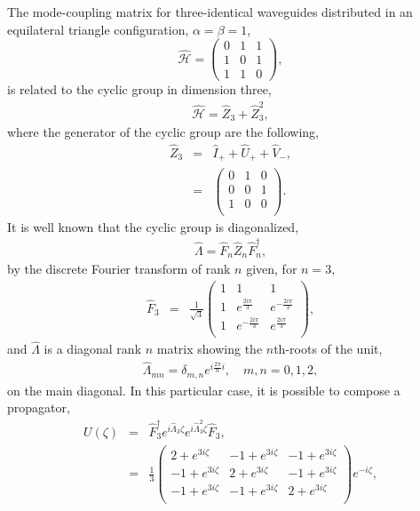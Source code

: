 \documentclass[9pt,twocolumn,twoside]{osajnl}
\begin{document}
The mode-coupling matrix for three-identical waveguides distributed in an equilateral triangle configuration, $\alpha = \beta = 1$, 
\begin{equation}
\hat{\mathcal{H}}=\left( \begin{array}{ccc}
0 & 1 & 1 \\
1 & 0 & 1 \\
1 & 1 & 0 \end{array} \right),	 
\end{equation}
is related to the cyclic group in dimension three, 
\begin{eqnarray}
\hat{\mathcal{H}} =  \hat{Z}_{3} + \hat{Z}_{3}^{2} ,
\end{eqnarray}
where the generator of the cyclic group are the following, 
\begin{eqnarray}
\hat{Z}_{3} &=& \hat{I}_{+} + \hat{U}_{+} + \hat{V}_{-}, \nonumber \\
&=&\left(
\begin{array}{ccc}
 0 & 1 & 0 \\
 0 & 0 & 1 \\
 1 & 0 & 0 \\
\end{array}\right).
\end{eqnarray}
It is well known that the cyclic group is diagonalized, 
\begin{eqnarray}
\hat{\Lambda} = \hat{F}_{n} \hat{Z}_{n} \hat{F}_{n}^{\dagger},
\end{eqnarray}
by the discrete Fourier transform of rank $n$ given, for $n=3$,
\begin{eqnarray}
\hat{F}_{3} &=& 
\frac{1}{\sqrt{3}}
\left(
\begin{array}{ccc}
 1 & 1 & 1 \\
 1 & e^{\frac{2 i \pi}{3}} & e^{-\frac{2 i \pi}{3}} \\
 1 & e^{-\frac{2 i \pi}{3}} & e^{\frac{2 i \pi}{3}} \\
\end{array}\right),
\end{eqnarray}
and $\hat{\Lambda}$ is a diagonal rank $n$ matrix showing the $n$th-roots of the unit,
\begin{eqnarray}
\hat{\Lambda}_{mn} = \delta_{m,n} e^{ i \frac{2 \pi}{n} i}, \quad  m,n = 0,1,2,
\end{eqnarray} 
on the main diagonal.
In this particular case, it is possible to compose a propagator,
\begin{eqnarray}
U(\zeta) &=& \hat{F}_{3}^{\dagger} e^{i \hat{\Lambda}_{3} \zeta} e^{i \hat{\Lambda}_{3}^{2} \zeta} \hat{F}_{3}, \nonumber \\
&=& \frac{1}{3}\left(
\begin{array}{ccc}
 2+e^{3 i \zeta} & -1+e^{3 i \zeta} & -1+e^{3 i \zeta} \\
 -1+e^{3 i \zeta} & 2+e^{3 i \zeta} & -1+e^{3 i \zeta} \\
 -1+e^{3 i \zeta} & -1+e^{3 i \zeta} & 2+e^{3 i \zeta} \\
\end{array}
\right) e^{-i \zeta},
\end{eqnarray}
\end{document}
